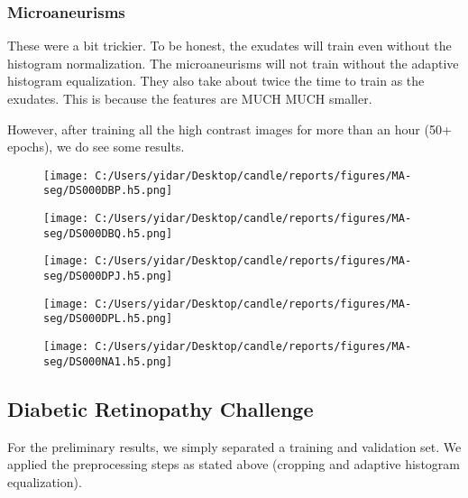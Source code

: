 \documentclass[11pt]{article}
\makeatletter
\def\maxwidth{\ifdim\Gin@nat@width>\linewidth\linewidth
    \else\Gin@nat@width\fi}
\let\Oldincludegraphics\includegraphics
\renewcommand{\includegraphics}[1]{\Oldincludegraphics[width=.8\maxwidth]{#1}}
\makeatother
\begin{document}
\clearpage
\clearpage
\clearpage
\pagebreak

    \subsubsection{Microaneurisms}\label{microaneurisms}

These were a bit trickier. To be honest, the exudates will train even
without the histogram normalization. The microaneurisms will not train
without the adaptive histogram equalization. They also take about twice
the time to train as the exudates. This is because the features are MUCH
MUCH smaller.

However, after training all the high contrast images for more than an
hour (50+ epochs), we do see some results.

\begin{figure}
\centering
\texttt{[image: C:/Users/yidar/Desktop/candle/reports/figures/MA-seg/DS000DBP.h5.png]}
\caption{}
\end{figure}

\begin{figure}
\centering
\texttt{[image: C:/Users/yidar/Desktop/candle/reports/figures/MA-seg/DS000DBQ.h5.png]}
\caption{}
\end{figure}

\begin{figure}
\centering
\texttt{[image: C:/Users/yidar/Desktop/candle/reports/figures/MA-seg/DS000DPJ.h5.png]}
\caption{}
\end{figure}

\begin{figure}
\centering
\texttt{[image: C:/Users/yidar/Desktop/candle/reports/figures/MA-seg/DS000DPL.h5.png]}
\caption{}
\end{figure}

\begin{figure}
\centering
\texttt{[image: C:/Users/yidar/Desktop/candle/reports/figures/MA-seg/DS000NA1.h5.png]}
\caption{}
\end{figure}

    \subsection{Diabetic Retinopathy
Challenge}\label{diabetic-retinopathy-challenge}

For the preliminary results, we simply separated a training and
validation set. We applied the preprocessing steps as stated above
(cropping and adaptive histogram equalization).
\end{document}
